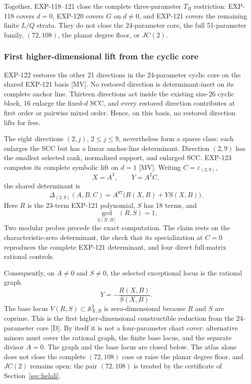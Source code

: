 \documentclass[11pt]{article}
\theoremstyle{remark}
\newcommand{\Q}{\mathbb{Q}}
\begin{document}
Together, EXP-118--121 close the complete three-parameter \(T_B\)
restriction: EXP-118 covers \(d=0\), EXP-120 covers \(G\) on \(d\ne0\), and
EXP-121 covers the remaining finite \(L/Q\) strata. They do not close the
24-parameter core, the full 51-parameter family, \((72,108)\), the planar
degree floor, or \(JC(2)\).

\subsubsection{First higher-dimensional lift from the cyclic core}

EXP-122 restores the other 21 directions in the 24-parameter cyclic core on
the shared EXP-121 basis [MV]. No restored direction is
determinant-inert on its complete anchor line. Thirteen directions act inside
the existing size-26 cyclic block, 16 enlarge the fixed-\(d\) SCC, and every
restored direction contributes at first order or pairwise mixed order. Hence, on
this basis, no restored direction lifts for free.

The eight directions \((2,j)\), \(2\leq j\leq9\), nevertheless form a sparse
class: each enlarges the SCC but has a linear anchor-line determinant.
Direction \((2,9)\) has the smallest selected rank, normalized support, and
enlarged SCC. EXP-123 computes its complete symbolic lift on \(d=1\) [MV].
Writing \(C=\varepsilon_{(2,9)}\),
\[
 X=A^3,\qquad Y=A^2C,
\]
the shared determinant is
\[
 \Delta_{(2,9)}(A,B,C)
 =A^{87}\bigl(R(X,B)+Y S(X,B)\bigr).
\]
Here \(R\) is the 23-term EXP-121 polynomial, \(S\) has 18 terms, and
\[
 \gcd_{\Q[X,B]}(R,S)=1.
\]
Two modular probes precede the exact computation. The claim rests on the
characteristic-zero determinant, the check that its specialization at \(C=0\)
reproduces the complete EXP-121 determinant, and four direct full-matrix rational
controls.

Consequently, on \(A\ne0\) and \(S\ne0\), the selected exceptional locus is
the rational graph
\[
 Y=-\frac{R(X,B)}{S(X,B)}.
\]
The base locus \(V(R,S)\subset\mathbb A^2_{X,B}\) is
zero-dimensional because \(R\) and \(S\) are coprime. This is the first
higher-dimensional constructible reduction from the 24-parameter core [D].
By itself it is not a four-parameter chart cover: alternative minors must
cover the rational graph, the finite base locus, and the separate divisor
\(A=0\). The graph and the base locus are closed below.
The atlas alone does not close the complete \((72,108)\) case or raise the planar degree floor, and \(JC(2)\) remains
open; the pair \((72,108)\) is treated by the certificate of Section~\ref{sec:helali}.
\end{document}
